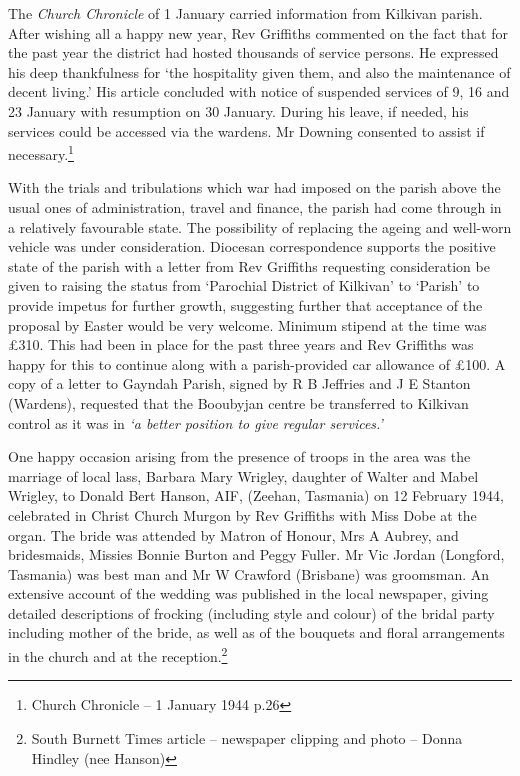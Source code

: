 The \emph{Church Chronicle} of 1 January carried information from Kilkivan parish. After wishing all a happy new year, Rev Griffiths commented on the fact that for the past year the district had hosted thousands of service persons. He expressed his deep thankfulness for `the hospitality given them, and also the maintenance of decent living.' His article concluded with notice of suspended services of 9, 16 and 23 January with resumption on 30 January. During his leave, if needed, his services could be accessed via the wardens. Mr Downing consented to assist if necessary.\footnote{Church Chronicle -- 1 January 1944 p.26}


With the trials and tribulations which war had imposed on the parish above the usual ones of administration, travel and finance, the parish had come through in a relatively favourable state. The possibility of replacing the ageing and well-worn vehicle was under consideration. Diocesan correspondence supports the positive state of the parish with a letter from Rev Griffiths requesting consideration be given to raising the status from `Parochial District of Kilkivan' to `Parish' to provide impetus for further growth, suggesting further that acceptance of the proposal by Easter would be very welcome. Minimum stipend at the time was \pounds310. This had been in place for the past three years and Rev Griffiths was happy for this to continue along with a parish-provided car allowance of \pounds100. A copy of a letter to Gayndah Parish, signed by R B Jeffries and J E Stanton (Wardens), requested that the Booubyjan centre be transferred to Kilkivan control as it was in \emph{`a better position to give regular services.'}



One happy occasion arising from the presence of troops in the area was the marriage of local lass, Barbara Mary Wrigley, daughter of Walter and Mabel Wrigley, to Donald Bert Hanson, AIF, (Zeehan, Tasmania) on 12 February 1944, celebrated in Christ Church Murgon by Rev Griffiths with Miss Dobe at the organ. The bride was attended by Matron of Honour, Mrs A Aubrey, and bridesmaids, Missies Bonnie Burton and Peggy Fuller. Mr Vic Jordan (Longford, Tasmania) was best man and Mr W Crawford (Brisbane) was groomsman. An extensive account of the wedding was published in the local newspaper, giving detailed descriptions of frocking (including style and colour) of the bridal party including mother of the bride, as well as of the bouquets and floral arrangements in the church and at the reception.\footnote{South Burnett Times article -- newspaper clipping and photo -- Donna Hindley (nee Hanson)}








